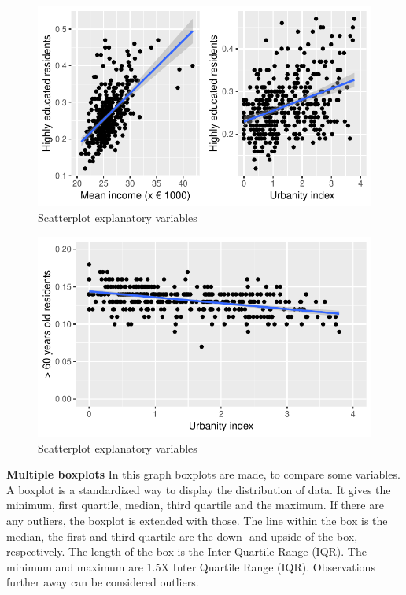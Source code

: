 \documentclass[11pt,]{article}
\begin{document}
\begin{figure}[H]

{\centering \includegraphics{Report_files/figure-latex/unnamed-chunk-7-1} 

}

\caption{\label{5}Scatterplot explanatory variables}\label{fig:unnamed-chunk-71}
\end{figure}\begin{figure}[H]

{\centering \includegraphics{Report_files/figure-latex/unnamed-chunk-7-2} 

}

\caption{\label{5}Scatterplot explanatory variables}\label{fig:unnamed-chunk-72}
\end{figure}

\textbf{Multiple boxplots} In this graph boxplots are made, to compare
some variables. A boxplot is a standardized way to display the
distribution of data. It gives the minimum, first quartile, median,
third quartile and the maximum. If there are any outliers, the boxplot
is extended with those. The line within the box is the median, the first
and third quartile are the down- and upside of the box, respectively.
The length of the box is the Inter Quartile Range (IQR). The minimum and
maximum are 1.5X Inter Quartile Range (IQR). Observations further away
can be considered outliers.
\end{document}
